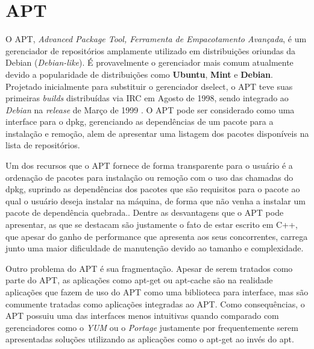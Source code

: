\section*{APT} %
\label{sec:apt}



O {\code APT}, \textit{Advanced Package Tool, Ferramenta de Empacotamento Avançada}, é um gerenciador de repositórios  amplamente utilizado em distribuições oriundas da Debian (\textit{Debian-like}).
É provavelmente o gerenciador mais comum atualmente devido a popularidade de distribuições como \textbf{Ubuntu}, \textbf{Mint} e \textbf{Debian}.
Projetado inicialmente para substituir o gerenciador {\code dselect}, o APT teve suas primeiras \textit{builds} distribuídas via IRC em Agosto de 1998,  sendo integrado ao \textit{Debian} na \textit{release} de Março de 1999 \cite{garbee2008brief}. O  APT pode ser considerado como uma interface para o {\code dpkg}, gerenciando as dependências de um pacote para a instalação e remoção, alem de apresentar uma listagem dos pacotes disponíveis na lista de repositórios. 

Um dos recursos que o APT fornece de forma transparente para o usuário é a ordenação de pacotes para instalação ou remoção com o uso das chamadas do {\code dpkg}, suprindo as dependências dos pacotes que são requisitos para o pacote ao qual o usuário deseja instalar na máquina, de forma que não venha a instalar um pacote de dependência quebrada.. Dentre as desvantagens que o APT pode apresentar, as que se destacam são justamente o fato de estar escrito em C++, que apesar do ganho de performance que apresenta aos seus concorrentes, carrega junto uma maior dificuldade de manutenção devido ao tamanho e complexidade. 

Outro problema do APT é sua fragmentação. Apesar de serem tratados como parte do APT, as aplicações como {\code apt-get} ou {\code apt-cache} são na realidade aplicações que fazem de uso do APT como uma biblioteca para interface, mas são comumente tratadas como aplicações integradas ao APT. Como consequências, o APT possuiu uma das interfaces menos intuitivas quando comparado com gerenciadores como o \textit{YUM} ou o \textit{Portage} justamente por frequentemente serem apresentadas soluções utilizando as aplicações como o {\code apt-get} ao invés do {\code apt}.

